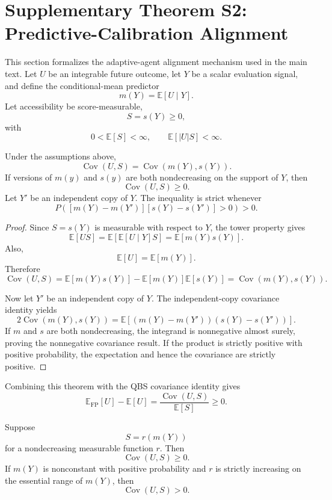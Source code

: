 \section{Supplementary Theorem S2: Predictive-Calibration Alignment}

This section formalizes the adaptive-agent alignment mechanism used in the main text. Let $U$ be an integrable future outcome, let $Y$ be a scalar evaluation signal, and define the conditional-mean predictor
\[
m(Y)=\mathbb E[U\mid Y].
\]
Let accessibility be score-measurable,
\[
S=s(Y)\ge0,
\]
with
\[
0<\mathbb E[S]<\infty,
\qquad
\mathbb E[|U|S]<\infty.
\]

\begin{theorem}
Under the assumptions above,
\[
\operatorname{Cov}(U,S)
=
\operatorname{Cov}(m(Y),s(Y)).
\]
If versions of $m(y)$ and $s(y)$ are both nondecreasing on the support of $Y$, then
\[
\operatorname{Cov}(U,S)\ge0.
\]
Let $Y'$ be an independent copy of $Y$. The inequality is strict whenever
\[
P\!\left(
[m(Y)-m(Y')][s(Y)-s(Y')]>0
\right)>0.
\]
\end{theorem}

\begin{proof}
Since $S=s(Y)$ is measurable with respect to $Y$, the tower property gives
\[
\mathbb E[US]
=
\mathbb E\!\left[\mathbb E[U\mid Y]S\right]
=
\mathbb E[m(Y)s(Y)].
\]
Also,
\[
\mathbb E[U]
=
\mathbb E[m(Y)].
\]
Therefore
\[
\operatorname{Cov}(U,S)
=
\mathbb E[m(Y)s(Y)]
-
\mathbb E[m(Y)]\mathbb E[s(Y)]
=
\operatorname{Cov}(m(Y),s(Y)).
\]

Now let $Y'$ be an independent copy of $Y$. The independent-copy covariance identity yields
\[
2\operatorname{Cov}(m(Y),s(Y))
=
\mathbb E\!\left[
(m(Y)-m(Y'))(s(Y)-s(Y'))
\right].
\]
If $m$ and $s$ are both nondecreasing, the integrand is nonnegative almost surely, proving the nonnegative covariance result. If the product is strictly positive with positive probability, the expectation and hence the covariance are strictly positive.
\end{proof}

Combining this theorem with the QBS covariance identity gives
\[
\mathbb E_{\mathrm{FP}}[U]-\mathbb E[U]
=
\frac{\operatorname{Cov}(U,S)}{\mathbb E[S]}
\ge0.
\]

\begin{corollary}
Suppose
\[
S=r(m(Y))
\]
for a nondecreasing measurable function $r$. Then
\[
\operatorname{Cov}(U,S)\ge0.
\]
If $m(Y)$ is nonconstant with positive probability and $r$ is strictly increasing on the essential range of $m(Y)$, then
\[
\operatorname{Cov}(U,S)>0.
\]
\end{corollary}

